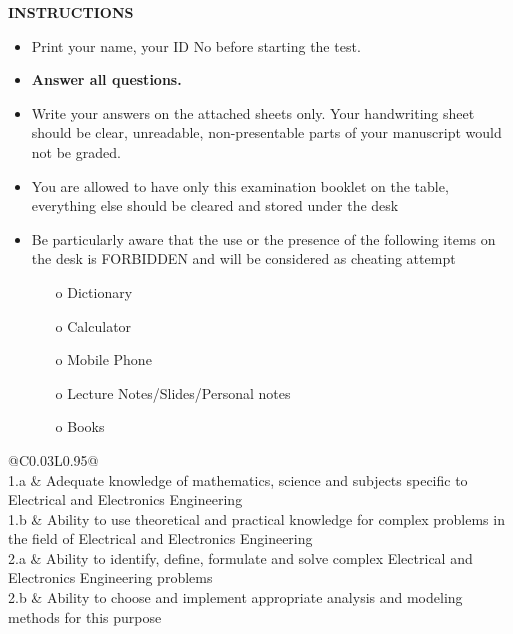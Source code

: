 \documentclass[a4paper, 11pt]{article}
\begin{document}
	\begin{center}
		\large
		\textbf{INSTRUCTIONS}
	\end{center}
	\begin{itemize}
		\setlength{\itemsep}{0pt}
		\setlength{\parskip}{1pt}
		\item Print your name, your ID No before starting the test.
		\item \textbf{Answer all questions.}
		\item Write your answers on the attached sheets only. Your handwriting sheet should be clear, unreadable, non-presentable parts of your manuscript would not be graded.
		\item You are allowed to have only this examination booklet on the table, everything else should be cleared and stored under the desk
		\item Be particularly aware that the use or the presence of the following items on the desk is FORBIDDEN and will be considered as cheating attempt
		\begin{itemize}
			\setlength{\itemsep}{0pt}
			\setlength{\parskip}{1pt}
			\item[o] Dictionary
			\item[o] Calculator
			\item[o] Mobile Phone
			\item[o] Lecture Notes/Slides/Personal notes
			\item[o] Books
		\end{itemize}
	\end{itemize}
	
	\begin{table}[hb!]
	\centering
		\begin{tabular}{@{}C{0.03\linewidth}L{0.95\linewidth}@{}}
			\toprule
			 \\
			\midrule
			1.a & Adequate knowledge of mathematics, science and subjects specific to Electrical and Electronics Engineering \\
			1.b & Ability to use theoretical and practical knowledge for complex problems in the field of Electrical and Electronics Engineering \\
			\midrule
			2.a & Ability to identify, define, formulate and solve complex Electrical and Electronics Engineering problems \\
			2.b & Ability to choose and implement appropriate analysis and modeling methods for this purpose \\
			\bottomrule
		\end{tabular}
	\end{table}
\end{document}
